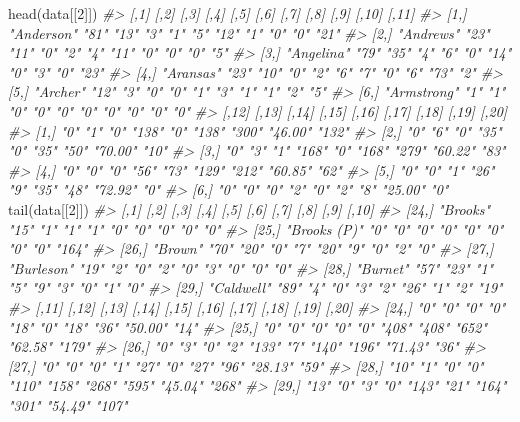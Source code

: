 \documentclass[
]{krantz}
\makeatletter
\newenvironment{Shaded}{\begin{snugshade}}{\end{snugshade}}
\newcommand{\CommentTok}[1]{\textcolor[rgb]{0.37,0.37,0.37}{\textit{#1}}}
\newcommand{\DecValTok}[1]{\textcolor[rgb]{0.06,0.06,0.06}{#1}}
\newcommand{\FunctionTok}[1]{\textcolor[rgb]{0,0,0}{#1}}
\newcommand{\NormalTok}[1]{#1}
\newenvironment{kframe}{%
\medskip{}
\setlength{\fboxsep}{.8em}
 \def\at@end@of@kframe{}%
 \ifinner\ifhmode%
  \def\at@end@of@kframe{\end{minipage}}%
  \begin{minipage}{\columnwidth}%
 \fi\fi%
 \def\FrameCommand##1{\hskip\@totalleftmargin \hskip-\fboxsep
 \colorbox{shadecolor}{##1}\hskip-\fboxsep
     \hskip-\linewidth \hskip-\@totalleftmargin \hskip\columnwidth}%
 \MakeFramed {\advance\hsize-\width
   \@totalleftmargin\z@ \linewidth\hsize
   \@setminipage}}%
 {\par\unskip\endMakeFramed%
 \at@end@of@kframe}
\renewenvironment{Shaded}{\begin{kframe}}{\end{kframe}}
\makeatother
\begin{document}
\begin{Shaded}
\begin{Highlighting}[]
\FunctionTok{head}\NormalTok{(data[[}\DecValTok{2}\NormalTok{]])}
\CommentTok{\#\textgreater{}      [,1]        [,2] [,3] [,4] [,5] [,6] [,7] [,8] [,9] [,10] [,11]}
\CommentTok{\#\textgreater{} [1,] "Anderson"  "81" "13" "3"  "1"  "5"  "12" "1"  "0"  "0"   "21" }
\CommentTok{\#\textgreater{} [2,] "Andrews"   "23" "11" "0"  "2"  "4"  "11" "0"  "0"  "0"   "5"  }
\CommentTok{\#\textgreater{} [3,] "Angelina"  "79" "35" "4"  "6"  "0"  "14" "0"  "3"  "0"   "23" }
\CommentTok{\#\textgreater{} [4,] "Aransas"   "23" "10" "0"  "2"  "6"  "7"  "0"  "6"  "73"  "2"  }
\CommentTok{\#\textgreater{} [5,] "Archer"    "12" "3"  "0"  "0"  "1"  "3"  "1"  "1"  "2"   "5"  }
\CommentTok{\#\textgreater{} [6,] "Armstrong" "1"  "1"  "0"  "0"  "0"  "0"  "0"  "0"  "0"   "0"  }
\CommentTok{\#\textgreater{}      [,12] [,13] [,14] [,15] [,16] [,17] [,18] [,19]   [,20]}
\CommentTok{\#\textgreater{} [1,] "0"   "1"   "0"   "138" "0"   "138" "300" "46.00" "132"}
\CommentTok{\#\textgreater{} [2,] "0"   "6"   "0"   "35"  "0"   "35"  "50"  "70.00" "10" }
\CommentTok{\#\textgreater{} [3,] "0"   "3"   "1"   "168" "0"   "168" "279" "60.22" "83" }
\CommentTok{\#\textgreater{} [4,] "0"   "0"   "0"   "56"  "73"  "129" "212" "60.85" "62" }
\CommentTok{\#\textgreater{} [5,] "0"   "0"   "1"   "26"  "9"   "35"  "48"  "72.92" "0"  }
\CommentTok{\#\textgreater{} [6,] "0"   "0"   "0"   "2"   "0"   "2"   "8"   "25.00" "0"}
\FunctionTok{tail}\NormalTok{(data[[}\DecValTok{2}\NormalTok{]])}
\CommentTok{\#\textgreater{}       [,1]         [,2] [,3] [,4] [,5] [,6] [,7] [,8] [,9] [,10]}
\CommentTok{\#\textgreater{} [24,] "Brooks"     "15" "1"  "1"  "1"  "0"  "0"  "0"  "0"  "0"  }
\CommentTok{\#\textgreater{} [25,] "Brooks (P)" "0"  "0"  "0"  "0"  "0"  "0"  "0"  "0"  "164"}
\CommentTok{\#\textgreater{} [26,] "Brown"      "70" "20" "0"  "7"  "20" "9"  "0"  "2"  "0"  }
\CommentTok{\#\textgreater{} [27,] "Burleson"   "19" "2"  "0"  "2"  "0"  "3"  "0"  "0"  "0"  }
\CommentTok{\#\textgreater{} [28,] "Burnet"     "57" "23" "1"  "5"  "9"  "3"  "0"  "1"  "0"  }
\CommentTok{\#\textgreater{} [29,] "Caldwell"   "89" "4"  "0"  "3"  "2"  "26" "1"  "2"  "19" }
\CommentTok{\#\textgreater{}       [,11] [,12] [,13] [,14] [,15] [,16] [,17] [,18] [,19]   [,20]}
\CommentTok{\#\textgreater{} [24,] "0"   "0"   "0"   "0"   "18"  "0"   "18"  "36"  "50.00" "14" }
\CommentTok{\#\textgreater{} [25,] "0"   "0"   "0"   "0"   "0"   "408" "408" "652" "62.58" "179"}
\CommentTok{\#\textgreater{} [26,] "0"   "3"   "0"   "2"   "133" "7"   "140" "196" "71.43" "36" }
\CommentTok{\#\textgreater{} [27,] "0"   "0"   "0"   "1"   "27"  "0"   "27"  "96"  "28.13" "59" }
\CommentTok{\#\textgreater{} [28,] "10"  "1"   "0"   "0"   "110" "158" "268" "595" "45.04" "268"}
\CommentTok{\#\textgreater{} [29,] "13"  "0"   "3"   "0"   "143" "21"  "164" "301" "54.49" "107"}
\end{Highlighting}
\end{Shaded}
\end{document}

